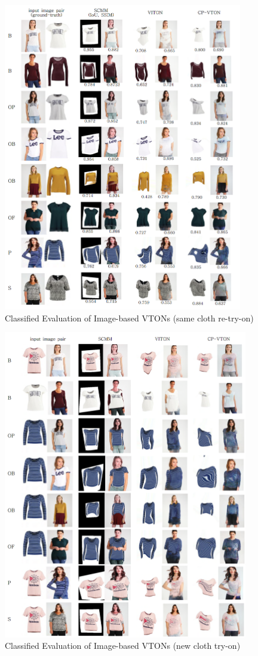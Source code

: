 \begin{figure}
\centering
\includegraphics[height=13.5cm, scale=1]{figures/2dvton_same.png}   
\caption{Classified Evaluation of Image-based VTONs (same cloth re-try-on)}
\label{fig:2dvton_same}
\end{figure}

\begin{figure}
\centering
\includegraphics[height=13.5cm, scale=1]{figures/2dvton_diff.png}  %
\caption{Classified Evaluation of Image-based VTONs (new cloth try-on)}
\label{fig:2dvton_diff}
\end{figure}
